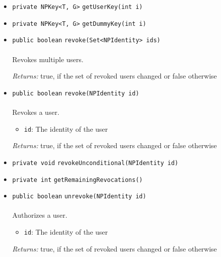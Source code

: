 \begin{itemize}
\item \lstinline|private NPKey<T, G>| \lstinline|getUserKey|\lstinline|(int i)| \\[-0.6em]




\item \lstinline|private NPKey<T, G>| \lstinline|getDummyKey|\lstinline|(int i)| \\[-0.6em]




\item \lstinline|public boolean| \lstinline|revoke|\lstinline|(Set<NPIdentity> ids)|\\ \\[-0.6em]
Revokes multiple users.

\emph{Returns:} true, if the set of revoked users changed or false otherwise

\item \lstinline|public boolean| \lstinline|revoke|\lstinline|(NPIdentity id)|\\ \\[-0.6em]
Revokes a user.
\begin{itemize}
\item \lstinline|id|: The identity of the user
\end{itemize}

\emph{Returns:} true, if the set of revoked users changed or false otherwise

\item \lstinline|private void| \lstinline|revokeUnconditional|\lstinline|(NPIdentity id)| \\[-0.6em]




\item \lstinline|private int| \lstinline|getRemainingRevocations|\lstinline|()| \\[-0.6em]




\item \lstinline|public boolean| \lstinline|unrevoke|\lstinline|(NPIdentity id)|\\ \\[-0.6em]
Authorizes a user.
\begin{itemize}
\item \lstinline|id|: The identity of the user
\end{itemize}

\emph{Returns:} true, if the set of revoked users changed or false otherwise


\end{itemize}
